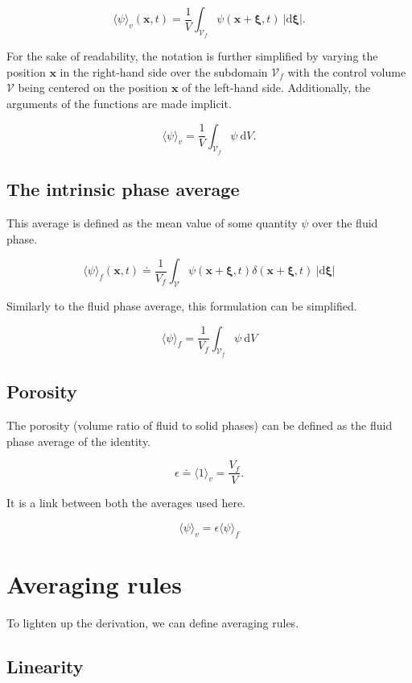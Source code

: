 \documentclass[a4paper,11pt]{article}
\begin{document}
$$\langle\psi\rangle_v(\bm x, t) = \frac{1}{V}\int_{\mathcal V_f} \psi(\bm x+\bm\xi, t)~\left|\mathrm d\bm \xi\right|.$$

For the sake of readability, the notation is further simplified by varying the position $\bm x$ in the right-hand side over the subdomain $\mathcal V_f$ with the control volume $\mathcal V$ being centered on the position $\bm x$ of the left-hand side.
Additionally, the arguments of the functions are made implicit.

$$\langle\psi\rangle_v = \frac{1}{V}\int_{\mathcal V_f}\psi~\mathrm dV.$$

\subsection{The intrinsic phase average}

This average is defined as the mean value of some quantity $\psi$ over the fluid phase.

$$\langle\psi\rangle_f(\bm x, t) \doteq \frac{1}{V_f}\int_{\mathcal V} \psi(\bm x+\bm\xi, t) \delta(\bm x + \bm\xi, t) ~\left|\mathrm d\bm \xi\right|$$

Similarly to the fluid phase average, this formulation can be simplified.

$$\langle\psi\rangle_f = \frac{1}{V_f}\int_{\mathcal V_f}\psi~\mathrm dV$$

\subsection{Porosity}\label{porosity}

The porosity (volume ratio of fluid to solid phases) can be defined as the fluid phase average of the identity.

$$\epsilon \doteq \langle 1\rangle_v = \frac{V_f}{V}.$$

It is a link between both the averages used here.

\begin{equation}\label{eq:fluid-intrinsic}
  \langle\psi\rangle_v=\epsilon\langle\psi\rangle_f
\end{equation}

\section{Averaging rules}\label{averaging-rules}

To lighten up the derivation, we can define averaging rules.

\subsection{Linearity}\label{linearity}
\end{document}

